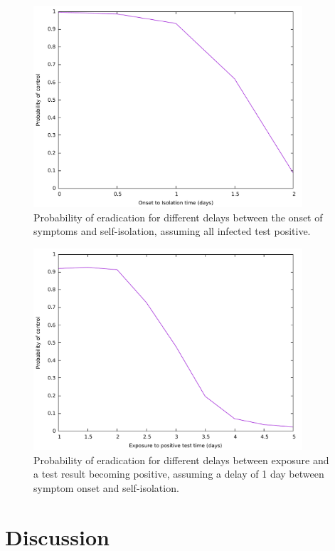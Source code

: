 \documentclass{article}
\begin{document}
\begin{figure}
\begin{center}
\includegraphics[width = 10cm]{onsetToIsolation.pdf}
\end{center}
\caption{Probability of eradication for different delays between the onset of symptoms and self-isolation, assuming all infected test positive.}
\label{onsetToIsolation}
\end{figure}

\begin{figure}
\begin{center}
\includegraphics[width = 10cm]{exposureToPositiveTest.pdf}
\end{center}
\caption{Probability of eradication for different delays between exposure and a test result becoming positive, assuming a delay of 1 day between symptom onset and self-isolation.}
\label{exposureToPositiveTest}
\end{figure}

\section{Discussion}
\end{document}
